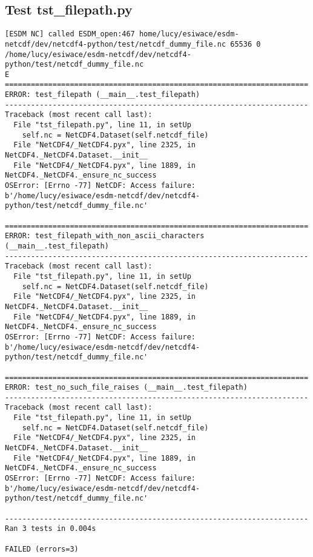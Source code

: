 \subsection{Test tst\_filepath.py}

\begin{verbatim}
[ESDM NC] called ESDM_open:467 home/lucy/esiwace/esdm-netcdf/dev/netcdf4-python/test/netcdf_dummy_file.nc 65536 0 /home/lucy/esiwace/esdm-netcdf/dev/netcdf4-python/test/netcdf_dummy_file.nc
E
======================================================================
ERROR: test_filepath (__main__.test_filepath)
----------------------------------------------------------------------
Traceback (most recent call last):
  File "tst_filepath.py", line 11, in setUp
    self.nc = NetCDF4.Dataset(self.netcdf_file)
  File "NetCDF4/_NetCDF4.pyx", line 2325, in NetCDF4._NetCDF4.Dataset.__init__
  File "NetCDF4/_NetCDF4.pyx", line 1889, in NetCDF4._NetCDF4._ensure_nc_success
OSError: [Errno -77] NetCDF: Access failure: b'/home/lucy/esiwace/esdm-netcdf/dev/netcdf4-python/test/netcdf_dummy_file.nc'

======================================================================
ERROR: test_filepath_with_non_ascii_characters (__main__.test_filepath)
----------------------------------------------------------------------
Traceback (most recent call last):
  File "tst_filepath.py", line 11, in setUp
    self.nc = NetCDF4.Dataset(self.netcdf_file)
  File "NetCDF4/_NetCDF4.pyx", line 2325, in NetCDF4._NetCDF4.Dataset.__init__
  File "NetCDF4/_NetCDF4.pyx", line 1889, in NetCDF4._NetCDF4._ensure_nc_success
OSError: [Errno -77] NetCDF: Access failure: b'/home/lucy/esiwace/esdm-netcdf/dev/netcdf4-python/test/netcdf_dummy_file.nc'

======================================================================
ERROR: test_no_such_file_raises (__main__.test_filepath)
----------------------------------------------------------------------
Traceback (most recent call last):
  File "tst_filepath.py", line 11, in setUp
    self.nc = NetCDF4.Dataset(self.netcdf_file)
  File "NetCDF4/_NetCDF4.pyx", line 2325, in NetCDF4._NetCDF4.Dataset.__init__
  File "NetCDF4/_NetCDF4.pyx", line 1889, in NetCDF4._NetCDF4._ensure_nc_success
OSError: [Errno -77] NetCDF: Access failure: b'/home/lucy/esiwace/esdm-netcdf/dev/netcdf4-python/test/netcdf_dummy_file.nc'

----------------------------------------------------------------------
Ran 3 tests in 0.004s

FAILED (errors=3)
\end{verbatim}


